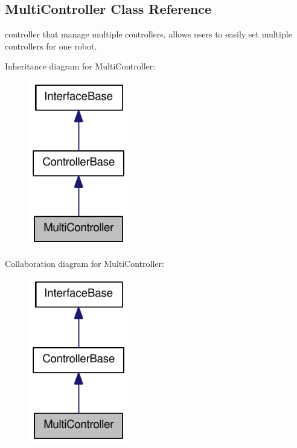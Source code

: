 \hypertarget{classOpenRAVE_1_1MultiController}{
\subsection{MultiController Class Reference}
\label{classOpenRAVE_1_1MultiController}
}


controller that manage multiple controllers, allows users to easily set multiple controllers for one robot.  




Inheritance diagram for MultiController:\nopagebreak
\begin{figure}[H]
\begin{center}
\leavevmode
\includegraphics[width=124pt]{classOpenRAVE_1_1MultiController__inherit__graph}
\end{center}
\end{figure}


Collaboration diagram for MultiController:\nopagebreak
\begin{figure}[H]
\begin{center}
\leavevmode
\includegraphics[width=124pt]{classOpenRAVE_1_1MultiController__coll__graph}
\end{center}
\end{figure}
